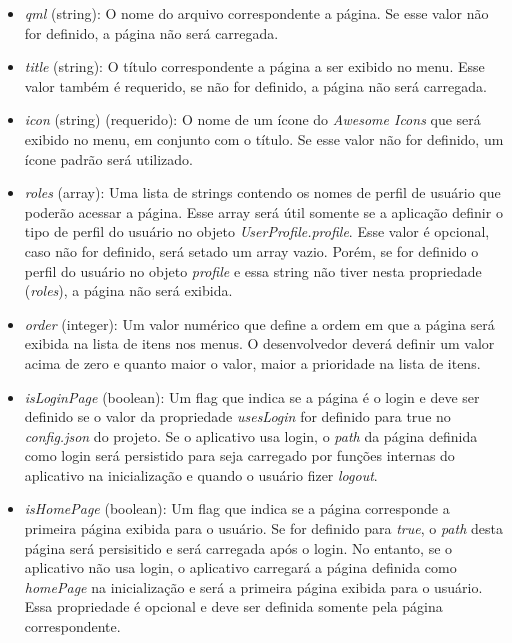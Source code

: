 \begin{itemize}
	\item \textit{qml} (string): O nome do arquivo correspondente a página. Se esse valor não for definido, a página não será carregada.

	\item \textit{title} (string): O título correspondente a página a ser exibido no menu. Esse valor também é requerido, se não for definido, a página não será carregada.

	\item \textit{icon} (string) (requerido): O nome de um ícone do \textit{Awesome Icons} que será exibido no menu, em conjunto com o título. Se esse valor não for definido, um ícone padrão será utilizado.

	\item \textit{roles} (array): Uma lista de strings contendo os nomes de perfil de usuário que poderão acessar a página. Esse array será útil somente se a aplicação definir o tipo de perfil do usuário no objeto \textit{UserProfile.profile}. Esse valor é opcional, caso não for definido, será setado um array vazio. Porém, se for definido o perfil do usuário no objeto \textit{profile} e essa string não tiver nesta propriedade (\textit{roles}), a página não será exibida.

	\item \textit{order} (integer): Um valor numérico que define a ordem em que a página será exibida na lista de itens nos menus. O desenvolvedor deverá definir um valor acima de zero e quanto maior o valor, maior a prioridade na lista de itens.

	\item \textit{isLoginPage} (boolean): Um flag que indica se a página é o login e deve ser definido se o valor da propriedade \textit{usesLogin} for definido para true no \textit{config.json} do projeto. Se o aplicativo usa login, o \textit{path} da página definida como login será persistido para seja carregado por funções internas do aplicativo na inicialização e quando o usuário fizer \textit{logout}.

	\item \textit{isHomePage} (boolean): Um flag que indica se a página corresponde a primeira página exibida para o usuário. Se for definido para \textit{true}, o \textit{path} desta página será persisitido e será carregada após o login. No entanto, se o aplicativo não usa login, o aplicativo carregará a página definida como \textit{homePage} na inicialização e será a primeira página exibida para o usuário. Essa propriedade é opcional e deve ser definida somente pela página correspondente.


\end{itemize}

